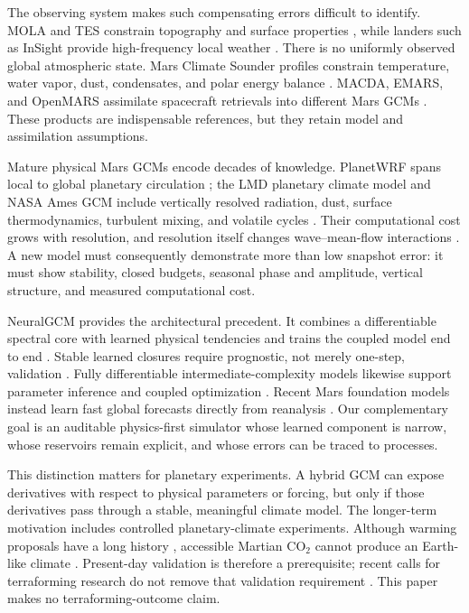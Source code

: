 \documentclass{article}
\begin{document}
The observing system makes such compensating errors difficult to identify.
MOLA and TES constrain topography and surface properties
\citep{smith2001mola,christensen2001tes}, while landers such as InSight provide
high-frequency local weather \citep{banfield2020insight}. There is no uniformly
observed global atmospheric state. Mars Climate Sounder profiles constrain
temperature, water vapor, dust, condensates, and polar energy balance
\citep{mccleese2007mcs}. MACDA, EMARS, and OpenMARS assimilate
spacecraft retrievals into different Mars GCMs
\citep{montabone2014macda,greybush2019emars,holmes2020openmars}. These products
are indispensable references, but they retain model and assimilation assumptions.

Mature physical Mars GCMs encode decades of knowledge. PlanetWRF spans local to
global planetary circulation \citep{richardson2007planetwrf}; the LMD planetary
climate model and NASA Ames GCM include vertically resolved radiation, dust, surface
thermodynamics, turbulent mixing, and volatile cycles
\citep{forget1999improved,haberle2019ames}. Their computational cost grows with
resolution, and resolution itself changes wave--mean-flow interactions
\citep{kling2025resolution}. A new model must consequently demonstrate more than
low snapshot error: it must show stability, closed budgets, seasonal phase and
amplitude, vertical structure, and measured computational cost.

NeuralGCM provides the architectural precedent. It combines a differentiable
spectral core with learned physical tendencies and trains the coupled model end
to end \citep{kochkov2024neuralgcm}. Stable learned closures require prognostic,
not merely one-step, validation \citep{yuval2020stable}. Fully differentiable
intermediate-complexity models likewise support parameter inference and coupled
optimization \citep{davenport2026jcm}. Recent Mars foundation models instead
learn fast global forecasts directly from reanalysis
\citep{roy2026foundation,singh2026aircast}. Our complementary goal is an
auditable physics-first simulator whose learned component is narrow, whose
reservoirs remain explicit, and whose errors can be traced to processes.

This distinction matters for planetary experiments. A hybrid GCM can expose
derivatives with respect to physical parameters or forcing, but only if those
derivatives pass through a stable, meaningful climate model. The longer-term
motivation includes controlled planetary-climate experiments. Although warming
proposals have a long history \citep{sagan1973planetary,mckay1991making},
accessible Martian \(\mathrm{CO_2}\) cannot produce an Earth-like climate
\citep{jakosky2018inventory}. Present-day validation is therefore a prerequisite;
recent calls for terraforming research do not remove that validation requirement
\citep{debenedictis2025case}. This paper makes no terraforming-outcome claim.
\end{document}
